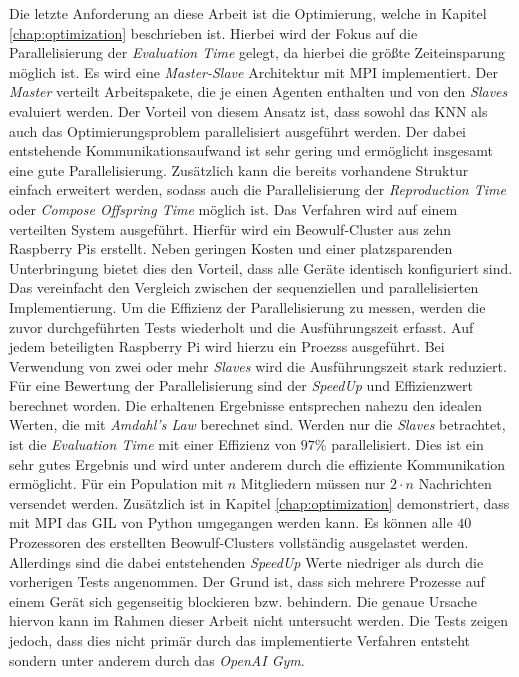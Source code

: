 Die letzte Anforderung an diese Arbeit ist die Optimierung, welche in Kapitel \ref{chap:optimization} beschrieben ist. Hierbei wird der Fokus auf die Parallelisierung der \emph{Evaluation Time} gelegt, da hierbei die größte Zeiteinsparung möglich ist. Es wird eine \emph{Master-Slave} Architektur mit \ac{MPI} implementiert. Der \emph{Master} verteilt Arbeitspakete, die je einen Agenten enthalten und von den \emph{Slaves} evaluiert werden. Der Vorteil von diesem Ansatz ist, dass sowohl das \ac{KNN} als auch das Optimierungsproblem parallelisiert ausgeführt werden. Der dabei entstehende Kommunikationsaufwand ist sehr gering und ermöglicht insgesamt eine gute Parallelisierung. Zusätzlich kann die bereits vorhandene Struktur einfach erweitert werden, sodass auch die Parallelisierung der \emph{Reproduction Time} oder \emph{Compose Offspring Time} möglich ist. Das Verfahren wird auf einem verteilten System ausgeführt. Hierfür wird ein Beowulf-Cluster aus zehn Raspberry Pis erstellt. Neben geringen Kosten und einer platzsparenden Unterbringung bietet dies den Vorteil, dass alle Geräte identisch konfiguriert sind. Das vereinfacht den Vergleich zwischen der sequenziellen und parallelisierten Implementierung. Um die Effizienz der Parallelisierung zu messen, werden die zuvor durchgeführten Tests wiederholt und die Ausführungszeit erfasst. Auf jedem beteiligten Raspberry Pi wird hierzu ein Proezss ausgeführt. Bei Verwendung von zwei oder mehr \emph{Slaves} wird die Ausführungszeit stark reduziert. Für eine Bewertung der Parallelisierung sind der \emph{SpeedUp} und Effizienzwert berechnet worden. Die erhaltenen Ergebnisse entsprechen nahezu den idealen Werten, die mit \emph{Amdahl's Law} berechnet sind. Werden nur die \emph{Slaves} betrachtet, ist die \emph{Evaluation Time} mit einer Effizienz von $97\%$ parallelisiert. Dies ist ein sehr gutes Ergebnis und wird unter anderem durch die effiziente Kommunikation ermöglicht. Für ein Population mit $n$ Mitgliedern müssen nur $2 \cdot n$ Nachrichten versendet werden. Zusätzlich ist in Kapitel \ref{chap:optimization} demonstriert, dass mit \ac{MPI} das \ac{GIL} von Python umgegangen werden kann. Es können alle $40$ Prozessoren des erstellten Beowulf-Clusters vollständig ausgelastet werden. Allerdings sind die dabei entstehenden \emph{SpeedUp} Werte niedriger als durch die vorherigen Tests angenommen. Der Grund ist, dass sich mehrere Prozesse auf einem Gerät sich gegenseitig blockieren bzw. behindern. Die genaue Ursache hiervon kann im Rahmen dieser Arbeit nicht untersucht werden. Die Tests zeigen jedoch, dass dies nicht primär durch das implementierte Verfahren entsteht sondern unter anderem durch das \emph{OpenAI Gym}.
